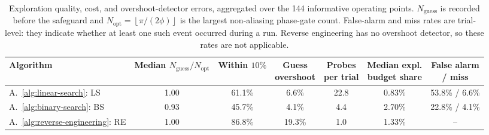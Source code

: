 \begin{table}[ht]
\centering
\small
\caption{Exploration quality, cost, and overshoot-detector errors, aggregated over the 144 informative operating points. $N_{\mathrm{guess}}$ is recorded before the safeguard and $N_{\mathrm{opt}}=\left\lfloor\pi/(2\phi)\right\rfloor$ is the largest non-aliasing phase-gate count. False-alarm and miss rates are trial-level: they indicate whether at least one such event occurred during a run. Reverse engineering has no overshoot detector, so these rates are not applicable.}
\label{tab:diag-search}
\begin{tabular}{lcccccc}
\toprule
Algorithm
& \makecell{Median \\ $N_{\mathrm{guess}}/N_{\mathrm{opt}}$}
& \makecell{Within \\ $10\%$}
& \makecell{Guess \\ overshoot}
& \makecell{Probes \\ per trial}
& \makecell{Median expl. \\ budget share}
& \makecell{False alarm \\ / miss} \\
\midrule
A.~\ref{alg:linear-search}: LS
& 1.00
& 61.1\%
& 6.6\%
& 22.8
& 0.83\%
& 53.8\% / 6.6\% \\
A.~\ref{alg:binary-search}: BS
& 0.93
& 45.7\%
& 4.1\%
& 4.4
& 2.70\%
& 22.8\% / 4.1\% \\
A.~\ref{alg:reverse-engineering}: RE
& 1.00
& 86.8\%
& 19.3\%
& 1.0
& 1.33\%
& -- \\
\bottomrule
\end{tabular}
\end{table}
